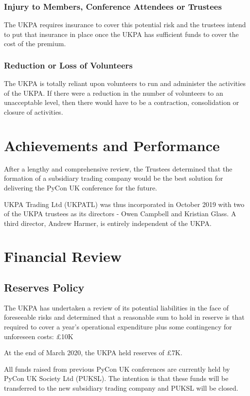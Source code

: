 \documentclass[11pt, final]{article}
\begin{document}
            \subsubsection{Injury to Members, Conference Attendees or Trustees}
            The UKPA requires insurance to cover this potential risk and the trustees intend to put that insurance in place once the UKPA has sufficient funds to cover the cost of the premium.

            \subsubsection{Reduction or Loss of Volunteers}
            The UKPA is totally reliant upon volunteers to run and administer the activities of the UKPA. If there were a reduction in the number of volunteers to an unacceptable level, then there would have to be a contraction, consolidation or closure of activities.

    \section{Achievements and Performance}
        After a lengthy and comprehensive review, the Trustees determined that the formation of a subsidiary trading company would be the best solution for delivering the PyCon UK conference for the future.

		UKPA Trading Ltd (UKPATL) was thus incorporated in October 2019 with two of the UKPA trustees as its directors - Owen Campbell and Kristian Glass. A third director, Andrew Harmer, is entirely independent of the UKPA.

    \section{Financial Review}

        \subsection{Reserves Policy}
		The UKPA has undertaken a review of its potential liabilities in the face of foreseeable risks and determined that a reasonable sum to hold in reserve is that required to cover a year's operational expenditure plus some contingency for unforeseen costs: \pounds10K

        At the end of March 2020, the UKPA held reserves of \pounds7K.

        All funds raised from previous PyCon UK conferences are currently held by PyCon UK Society Ltd (PUKSL). The intention is that these funds will be transferred to the new subsidiary trading company  and PUKSL will be closed.
\end{document}
